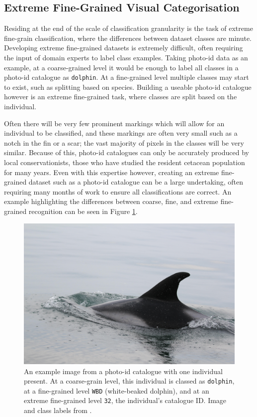 \subsection{Extreme Fine-Grained Visual Categorisation}\label{ch:Background,sec:ExtremeFine-grainedCV}

Residing at the end of the scale of classification granularity is the task of extreme fine-grain classification, where the differences between dataset classes are minute. Developing extreme fine-grained datasets is extremely difficult, often requiring the input of domain experts to label class examples. Taking photo-id data as an example, at a coarse-grained level it would be enough to label all classes in a photo-id catalogue as \texttt{dolphin}. At a fine-grained level multiple classes may start to exist, such as splitting based on species. Building a useable photo-id catalogue however is an extreme fine-grained task, where classes are split based on the individual. 

Often there will be very few prominent markings which will allow for an individual to be classified, and these markings are often very small such as a notch in the fin or a scar; the vast majority of pixels in the classes will be very similar. Because of this, photo-id catalogues can only be accurately produced by local conservationists, those who have studied the resident cetacean population for many years. Even with this expertise however, creating an extreme fine-grained dataset such as a photo-id catalogue can be a large undertaking, often requiring many months of work to ensure all classifications are correct. An example highlighting the differences between coarse, fine, and extreme fine-grained recognition can be seen in Figure \ref{fig:granularity-differences}.

\begin{figure}
	\begin{center}
		\includegraphics[scale=0.08]{Chapter2/figs/2192.jpg}
	\end{center}
	\caption{An example image from a photo-id catalogue with one individual present. At a coarse-grain level, this individual is classed as \texttt{dolphin}, at a fine-grained level \texttt{WBD} (white-beaked dolphin), and at an extreme fine-grained level \texttt{32}, the individual's catalogue ID. Image and class labels from \cite{trotter_ndd20_2020}.}
	\label{fig:granularity-differences}
\end{figure}


